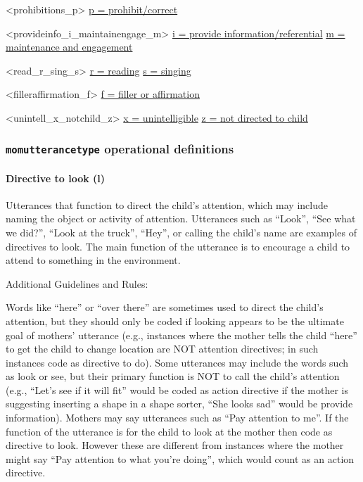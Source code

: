 \documentclass[
]{book}
\begin{document}
\textless prohibitions\_p\textgreater{}
\protect\hyperlink{prohibit_correct}{p = prohibit/correct}

\textless provideinfo\_i\_maintainengage\_m\textgreater{}
\protect\hyperlink{provide_info}{i = provide information/referential}
\protect\hyperlink{maintenance_engagement}{m = maintenance and engagement}

\textless read\_r\_sing\_s\textgreater{}
\protect\hyperlink{reading}{r = reading}
\protect\hyperlink{singing}{s = singing}

\textless filleraffirmation\_f\textgreater{}
\protect\hyperlink{filler_affirmation}{f = filler or affirmation}

\textless unintell\_x\_notchild\_z\textgreater{}
\protect\hyperlink{unintelligible_mom}{x = unintelligible}
\protect\hyperlink{not_directed_to_child}{z = not directed to child}

\hypertarget{momutterancetype-operational-definitions}{%
\subsubsection*{\texorpdfstring{\texttt{momutterancetype} operational definitions}{momutterancetype operational definitions}}\label{momutterancetype-operational-definitions}}

\hypertarget{directive_to_look}{%
\paragraph*{Directive to look (l)}\label{directive_to_look}}

Utterances that function to direct the child's attention, which may include naming the object or activity of attention. Utterances such as ``Look'', ``See what we did?'', ``Look at the truck'', ``Hey'', or calling the child's name are examples of directives to look. The main function of the utterance is to encourage a child to attend to something in the environment.

Additional Guidelines and Rules:

Words like ``here'' or ``over there'' are sometimes used to direct the child's attention, but they should only be coded if looking appears to be the ultimate goal of mothers' utterance (e.g., instances where the mother tells the child ``here'' to get the child to change location are NOT attention directives; in such instances code as directive to do).
Some utterances may include the words such as look or see, but their primary function is NOT to call the child's attention (e.g., ``Let's see if it will fit'' would be coded as action directive if the mother is suggesting inserting a shape in a shape sorter, ``She looks sad'' would be provide information). Mothers may say utterances such as ``Pay attention to me''. If the function of the utterance is for the child to look at the mother then code as directive to look. However these are different from instances where the mother might say ``Pay attention to what you're doing'', which would count as an action directive.
\end{document}
